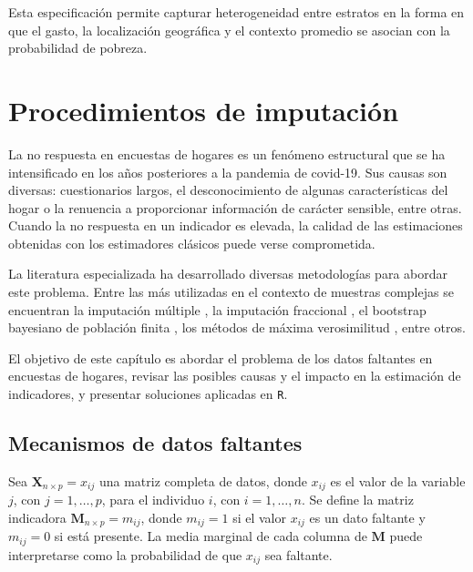 \documentclass[
  spanish,
  12pt,
]{book}
\begin{document}
Esta especificación permite capturar heterogeneidad entre estratos en la forma en que el gasto, la localización geográfica y el contexto promedio se asocian con la probabilidad de pobreza.

\chapter{Procedimientos de imputación}\label{cap-imputacion}

La no respuesta en encuestas de hogares es un fenómeno estructural que se ha intensificado en los años posteriores a la pandemia de covid-19. Sus causas son diversas: cuestionarios largos, el desconocimiento de algunas características del hogar o la renuencia a proporcionar información de carácter sensible, entre otras. Cuando la no respuesta en un indicador es elevada, la calidad de las estimaciones obtenidas con los estimadores clásicos puede verse comprometida.

La literatura especializada ha desarrollado diversas metodologías para abordar este problema. Entre las más utilizadas en el contexto de muestras complejas se encuentran la imputación múltiple \citep{vanbuuren2012flexible, carpenter2013multiple, berglund2014multiple, raghunathan2016missing}, la imputación fraccional \citep{kim2004fractional, kim2014statistical}, el bootstrap bayesiano de población finita \citep{zhou2016resampling}, los métodos de máxima verosimilitud \citep{chambers2012maximum}, entre otros.

El objetivo de este capítulo es abordar el problema de los datos faltantes en encuestas de hogares, revisar las posibles causas y el impacto en la estimación de indicadores, y presentar soluciones aplicadas en \texttt{R}.

\section{Mecanismos de datos faltantes}\label{sec-mecanismos}

Sea \(\boldsymbol{X}_{n \times p} = x_{ij}\) una matriz completa de datos, donde \(x_{ij}\) es el valor de la variable \(j\), con \(j = 1, \ldots, p\), para el individuo \(i\), con \(i = 1, \ldots, n\). Se define la matriz indicadora \(\boldsymbol{M}_{n \times p} = m_{ij}\), donde \(m_{ij} = 1\) si el valor \(x_{ij}\) es un dato faltante y \(m_{ij} = 0\) si está presente. La media marginal de cada columna de \(\boldsymbol{M}\) puede interpretarse como la probabilidad de que \(x_{ij}\) sea faltante.
\end{document}
